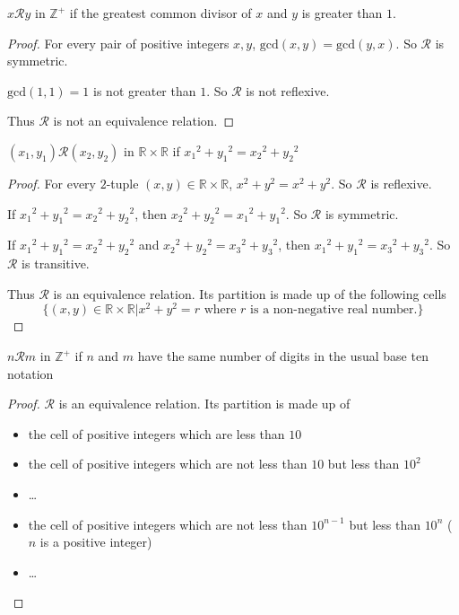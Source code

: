 \begin{exercise}
    $x\mathscr{R}y$ in $\mathbb{Z}^{+}$ if the greatest common divisor of $x$ and $y$ is greater than $1$.
\end{exercise}

\begin{proof}
    For every pair of positive integers $x, y$, $\text{gcd}(x, y) = \text{gcd}(y, x)$. So $\mathscr{R}$ is symmetric.

    $\text{gcd}(1, 1) = 1$ is not greater than $1$. So $\mathscr{R}$ is not reflexive.

    Thus $\mathscr{R}$ is not an equivalence relation.
\end{proof}

\begin{exercise}
    $(x_{1}, y_{1})\mathscr{R}(x_{2}, y_{2})$ in $\mathbb{R}\times\mathbb{R}$ if ${x_{1}}^{2} + {y_{1}}^{2} = {x_{2}}^{2} + {y_{2}}^{2}$
\end{exercise}

\begin{proof}
    For every $2$-tuple $(x, y) \in \mathbb{R}\times\mathbb{R}$, $x^{2} + y^{2} = x^{2} + y^{2}$. So $\mathscr{R}$ is reflexive.

    If ${x_{1}}^{2} + {y_{1}}^{2} = {x_{2}}^{2} + {y_{2}}^{2}$, then ${x_{2}}^{2} + {y_{2}}^{2} = {x_{1}}^{2} + {y_{1}}^{2}$. So $\mathscr{R}$ is symmetric.

    If ${x_{1}}^{2} + {y_{1}}^{2} = {x_{2}}^{2} + {y_{2}}^{2}$ and ${x_{2}}^{2} + {y_{2}}^{2} = {x_{3}}^{2} + {y_{3}}^{2}$, then ${x_{1}}^{2} + {y_{1}}^{2} = {x_{3}}^{2} + {y_{3}}^{2}$. So $\mathscr{R}$ is transitive.

    Thus $\mathscr{R}$ is an equivalence relation. Its partition is made up of the following cells
    \[
        \{ (x, y) \in \mathbb{R}\times\mathbb{R} \vert x^{2} + y^{2} = r \text{ where $r$ is a non-negative real number.} \}
    \]
\end{proof}

\begin{exercise}
    $n\mathscr{R}m$ in $\mathbb{Z}^{+}$ if $n$ and $m$ have the same number of digits in the usual base ten notation
\end{exercise}

\begin{proof}
    $\mathscr{R}$ is an equivalence relation. Its partition is made up of
    \begin{itemize}
        \item the cell of positive integers which are less than $10$
        \item the cell of positive integers which are not less than $10$ but less than $10^{2}$
        \item \ldots
        \item the cell of positive integers which are not less than $10^{n-1}$ but less than $10^{n}$ ($n$ is a positive integer)
        \item \ldots
    \end{itemize}
\end{proof}

